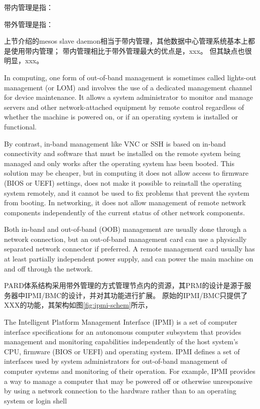 带内管理是指：

带外管理是指：

上节介绍的mesos slave daemon相当于带内管理，其他数据中心管理系统基本上都是使用带内管理；
带内管理相比于带外管理最大的优点是，xxx。
但其缺点也很明显，xxx。

In computing, one form of out-of-band management is sometimes called lights-out management (or LOM) and involves the use of a dedicated management channel for device maintenance. It allows a system administrator to monitor and manage servers and other network-attached equipment by remote control regardless of whether the machine is powered on, or if an operating system is installed or functional.

By contrast, in-band management like VNC or SSH is based on in-band connectivity and software that must be installed on the remote system being managed and only works after the operating system has been booted. This solution may be cheaper, but in computing it does not allow access to firmware (BIOS or UEFI) settings, does not make it possible to reinstall the operating system remotely, and it cannot be used to fix problems that prevent the system from booting. In networking, it does not allow management of remote network components independently of the current status of other network components.

Both in-band and out-of-band (OOB) management are usually done through a network connection, but an out-of-band management card can use a physically separated network connector if preferred. A remote management card usually has at least partially independent power supply, and can power the main machine on and off through the network.


PARD体系结构采用带外管理的方式管理节点内的资源，其PRM的设计是源于服务器中IPMI/BMC的设计，并对其功能进行扩展。
原始的IPMI/BMC只提供了XXX的功能，其架构如图\ref{fig:ipmi-schem}所示，

The Intelligent Platform Management Interface (IPMI) is a set of computer interface specifications for an autonomous computer subsystem that provides management and monitoring capabilities independently of the host system's CPU, firmware (BIOS or UEFI) and operating system. IPMI defines a set of interfaces used by system administrators for out-of-band management of computer systems and monitoring of their operation. For example, IPMI provides a way to manage a computer that may be powered off or otherwise unresponsive by using a network connection to the hardware rather than to an operating system or login shell

